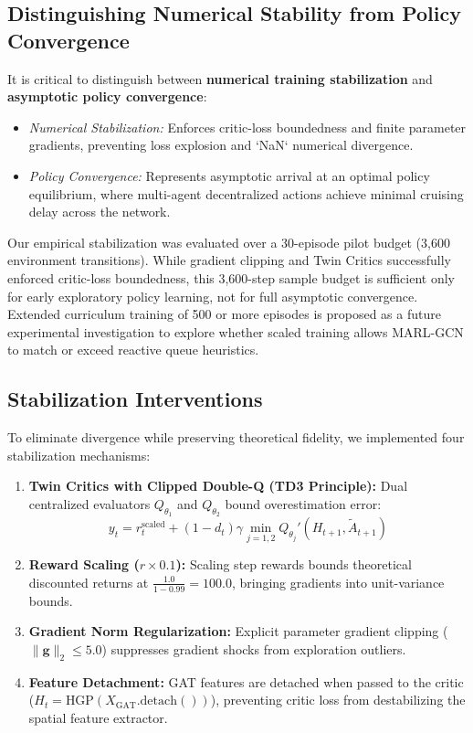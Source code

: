 \documentclass[journal]{IEEEtran}
\begin{document}
\subsection{Distinguishing Numerical Stability from Policy Convergence}
It is critical to distinguish between \textbf{numerical training stabilization} and \textbf{asymptotic policy convergence}:
\begin{itemize}
    \item \textit{Numerical Stabilization:} Enforces critic-loss boundedness and finite parameter gradients, preventing loss explosion and `NaN` numerical divergence.
    \item \textit{Policy Convergence:} Represents asymptotic arrival at an optimal policy equilibrium, where multi-agent decentralized actions achieve minimal cruising delay across the network.
\end{itemize}
Our empirical stabilization was evaluated over a 30-episode pilot budget (3,600 environment transitions). While gradient clipping and Twin Critics successfully enforced critic-loss boundedness, this 3,600-step sample budget is sufficient only for early exploratory policy learning, not for full asymptotic convergence. Extended curriculum training of 500 or more episodes is proposed as a future experimental investigation to explore whether scaled training allows MARL-GCN to match or exceed reactive queue heuristics.

\subsection{Stabilization Interventions}
To eliminate divergence while preserving theoretical fidelity, we implemented four stabilization mechanisms:
\begin{enumerate}
    \item \textbf{Twin Critics with Clipped Double-Q (TD3 Principle):} Dual centralized evaluators $Q_{\theta_1}$ and $Q_{\theta_2}$ bound overestimation error:
    \begin{equation}
    y_t = r_t^{\text{scaled}} + (1 - d_t) \gamma \min_{j=1,2} Q_{\theta_j}'(H_{t+1}, \tilde{A}_{t+1})
    \end{equation}
    \item \textbf{Reward Scaling ($r \times 0.1$):} Scaling step rewards bounds theoretical discounted returns at $\frac{1.0}{1 - 0.99} = 100.0$, bringing gradients into unit-variance bounds.
    \item \textbf{Gradient Norm Regularization:} Explicit parameter gradient clipping ($\|\mathbf{g}\|_2 \le 5.0$) suppresses gradient shocks from exploration outliers.
    \item \textbf{Feature Detachment:} GAT features are detached when passed to the critic ($H_t = \text{HGP}(X_{\text{GAT}}.\text{detach}())$), preventing critic loss from destabilizing the spatial feature extractor.
\end{enumerate}
\end{document}
